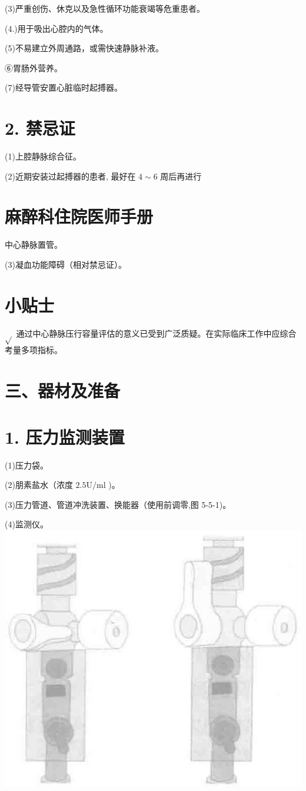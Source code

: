 \documentclass[10pt]{article}
\begin{document}
(3)严重创伤、休克以及急性循环功能衰竭等危重患者。

(4.)用于吸出心腔内的气体。

(5)不易建立外周通路，或需快速静脉补液。

⑥胃肠外营养。

(7)经导管安置心脏临时起搏器。

\section*{2. 禁忌证}
(1)上腔静脉综合征。

(2)近期安装过起搏器的患者, 最好在 $4 \sim 6$ 周后再进行

\section*{麻醉科住院医师手册}
中心静脉置管。

(3)凝血功能障碍（相对禁忌证）。

\section*{小贴士}
$\sqrt{ }$ 通过中心静脉压行容量评估的意义已受到广泛质疑。在实际临床工作中应综合考量多项指标。

\section*{三、器材及准备}
\section*{1. 压力监测装置}
(1)压力袋。

(2)朋素盐水（浓度 $2.5 \mathrm{U} / \mathrm{ml}$ )。

(3)压力管道、管道冲洗装置、换能器（使用前调零,图 5-5-1)。

(4)监测仪。\\
\includegraphics[max width=\textwidth, center]{2024_07_05_645bb794a4d4f32ee0c8g-302}
\end{document}
